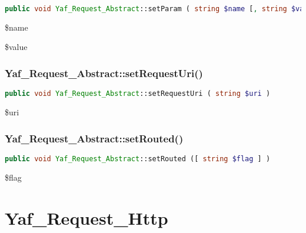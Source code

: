 \begin{lstlisting}[language=PHP]
public void Yaf_Request_Abstract::setParam ( string $name [, string $value ] )
\end{lstlisting}


\begin{compactitem}
\item \$name
\item \$value
\end{compactitem}



\subsection{Yaf\_Request\_Abstract::setRequestUri()}


\begin{lstlisting}[language=PHP]
public void Yaf_Request_Abstract::setRequestUri ( string $uri )
\end{lstlisting}

\begin{compactitem}
\item \$uri
\end{compactitem}



\subsection{Yaf\_Request\_Abstract::setRouted()}

\begin{lstlisting}[language=PHP]
public void Yaf_Request_Abstract::setRouted ([ string $flag ] )
\end{lstlisting}

\begin{compactitem}
\item \$flag
\end{compactitem}

\chapter{Yaf\_Request\_Http}



